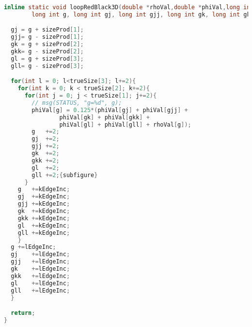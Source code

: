 \begin{lstlisting}[language=c, caption = loop routine]
  inline static void loopRedBlack3D(double *rhoVal,double *phiVal,long int *sizeProd, int *trueSize, int kEdgeInc, int lEdgeInc,
        long int g, long int gj, long int gjj, long int gk, long int gkk, long int gl, long int gll){

  gj = g + sizeProd[1];
  gjj= g - sizeProd[1];
  gk = g + sizeProd[2];
  gkk= g - sizeProd[2];
  gl = g + sizeProd[3];
  gll= g - sizeProd[3];

  for(int l = 0; l<trueSize[3]; l+=2){
    for(int k = 0; k < trueSize[2]; k+=2){
      for(int j = 0; j < trueSize[1]; j+=2){
        // msg(STATUS, "g=%d", g);
        phiVal[g] = 0.125*(phiVal[gj] + phiVal[gjj] +
                phiVal[gk] + phiVal[gkk] +
                phiVal[gl] + phiVal[gll] + rhoVal[g]);
        g	+=2;
        gj	+=2;
        gjj	+=2;
        gk	+=2;
        gkk	+=2;
        gl	+=2;
        gll	+=2;{subfigure}
      }
    g	+=kEdgeInc;
    gj	+=kEdgeInc;
    gjj	+=kEdgeInc;
    gk	+=kEdgeInc;
    gkk	+=kEdgeInc;
    gl	+=kEdgeInc;
    gll	+=kEdgeInc;
    }
  g	+=lEdgeInc;
  gj	+=lEdgeInc;
  gjj	+=lEdgeInc;
  gk	+=lEdgeInc;
  gkk	+=lEdgeInc;
  gl	+=lEdgeInc;
  gll	+=lEdgeInc;
  }

  return;
}
\end{lstlisting}

\newpage

